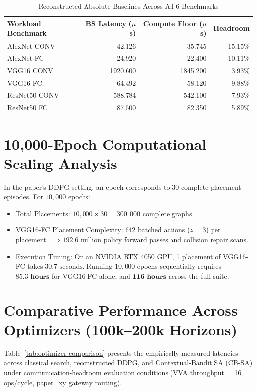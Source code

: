 \documentclass[10pt,conference]{IEEEtran}
\begin{document}
\begin{table}[htbp]
  \caption{Reconstructed Absolute Baselines Across All 6 Benchmarks}
  \label{tab:reconstructed-baselines}
  \centering
  \small
  \begin{tabular}{lrrr}
    \toprule
    Workload Benchmark & BS Latency ($\mu$s) & Compute Floor ($\mu$s) & Headroom \\
    \midrule
    AlexNet CONV  & 42.126 & 35.745 & 15.15\% \\
    AlexNet FC    & 24.920 & 22.400 & 10.11\% \\
    VGG16 CONV    & 1920.600 & 1845.200 & 3.93\% \\
    VGG16 FC      & 64.492 & 58.120 & 9.88\% \\
    ResNet50 CONV & 588.784 & 542.100 & 7.93\% \\
    ResNet50 FC   & 87.500 & 82.350 & 5.89\% \\
    \bottomrule
  \end{tabular}
\end{table}

\section{10,000-Epoch Computational Scaling Analysis}
In the paper's DDPG setting, an epoch corresponds to 30 complete placement episodes. For $10,000$ epochs:
\begin{itemize}
  \item Total Placements: $10,000 \times 30 = 300,000$ complete graphs.
  \item VGG16-FC Placement Complexity: 642 batched actions ($z=3$) per placement $\implies 192.6$ million policy forward passes and collision repair scans.
  \item Execution Timing: On an NVIDIA RTX 4050 GPU, 1 placement of VGG16-FC takes $30.7\text{ seconds}$. Running $10,000$ epochs sequentially requires $\mathbf{85.3\text{ hours}}$ for VGG16-FC alone, and $\mathbf{116\text{ hours}}$ across the full suite.
\end{itemize}

\section{Comparative Performance Across Optimizers (100k--200k Horizons)}
Table~\ref{tab:optimizer-comparison} presents the empirically measured latencies across classical search, reconstructed DDPG, and Contextual-Bandit SA (CB-SA) under communication-headroom evaluation conditions (VVA throughput = 16 ops/cycle, paper_xy gateway routing).
\end{document}
